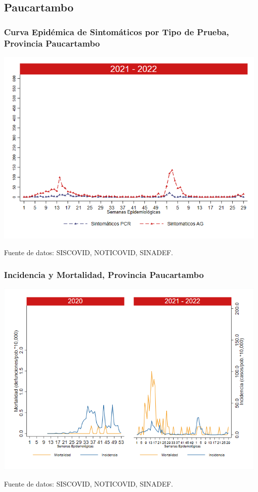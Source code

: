 \documentclass[xcolor=table]{beamer}
\begin{document}
\subsection{Paucartambo}
\begin{frame}[label=Paucartambo]
	\frametitle{Curva Epidémica de Sintomáticos por Tipo de Prueba, Provincia Paucartambo}
	\vspace{-.5cm}
	\begin{center}
		\includegraphics[width=0.8\linewidth, trim={0cm .5cm 0cm 0.2cm},clip]{../figuras/sinto_prueba20_21_11.png}
	\end{center}
	{\tiny Fuente de datos: SISCOVID, NOTICOVID, SINADEF.}
	\hyperlink{TipoPrueba}{}
\end{frame}

\begin{frame}[label=Paucartambo]
	\frametitle{Incidencia y Mortalidad, Provincia Paucartambo}
	\vspace{-.5cm}
	\begin{center}
		\includegraphics[width=0.8\linewidth, trim={0cm .5cm 0cm 0.2cm},clip]{../figuras/incidencia_mortalidad_20_21_11.png}
	\end{center}
	{\tiny Fuente de datos: SISCOVID, NOTICOVID, SINADEF.}
\end{frame}
\end{document}
